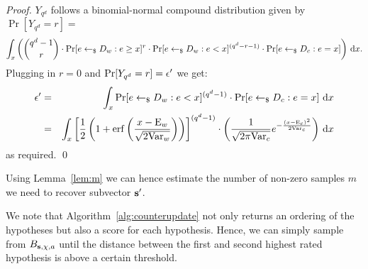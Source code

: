 \begin{proof}
$Y_{q^d}$ follows a binomial-normal compound distribution given by $\Pr[Y_{q^d}=r] =$
\begin{equation*}
\int_{x}{\left(\binom{q^d-1}{r}\cdot \Pr[e \sample D_w: e \geq x]^{r} \cdot \Pr[e \sample D_w: e < x]^{(q^d-r-1)} \cdot \Pr[e \sample D_c: e = x]\right)}\ 
\mathrm{d}x.
\end{equation*}
Plugging in $r=0$ and $\Pr[Y_{q^d}=r] = \epsilon'$ we get:
\begin{eqnarray*}
\epsilon' 
  &=& \int_{x}{\Pr[e \leftarrow_{\$} D_w: e < x]^{(q^d-1)} \cdot \Pr[e \leftarrow_{\$} D_c: e = x]}\ \mathrm{d}x\\
  &=&\int_{x}{\left[\frac{1}{2}\left(1+\operatorname{erf}\left(\frac{x-\textnormal{E}_w}{\sqrt{2\textnormal{Var}_w}}\right)\right)\right]^{(q^d-1)} \cdot \left( \frac{1}{\sqrt{2\pi \textnormal{Var}_c}}e^{-\frac{(x-\textnormal{E}_c)^2}{2\textnormal{Var}_c}} \right)}\ \mathrm{d}x
\end{eqnarray*}
as required. \qed
\end{proof}

Using Lemma~\ref{lem:m} we can hence estimate the number of non-zero samples $m$ we need to recover subvector $\mathbf{s'}$.

\begin{remark}
We note that Algorithm~\ref{alg:counterupdate} not only returns an ordering of the hypotheses but also a score for each hypothesis. Hence, we can simply sample from $B_{\mathbf{s},\chi,a}$ until the distance between the first and second highest rated hypothesis is above a certain threshold. 
\end{remark}
